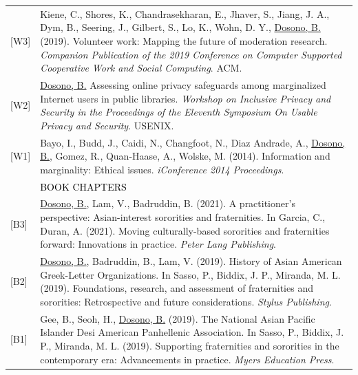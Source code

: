 \documentclass[12pt]{article}
\begin{document}
{\begin{longtable}{R{0.75in}p{5.0in}}
\footnotesize{[W3]} & Kiene, C., Shores, K., Chandrasekharan, E., Jhaver, S., Jiang, J. A., Dym, B., Seering, J., Gilbert, S., Lo, K., Wohn, D. Y., \href{https://dl.acm.org/authorize?N690536}{Dosono, B.} (2019). Volunteer work: Mapping the future of moderation research. \textit{Companion Publication of the 2019 Conference on Computer Supported Cooperative Work and Social Computing}. ACM.\\

\footnotesize{[W2]} & \href{https://www.usenix.org/sites/default/files/soups15_full_proceedings.pdf}{Dosono, B.} Assessing online privacy safeguards among marginalized Internet users in public libraries. \textit{Workshop on Inclusive Privacy and Security in the Proceedings of the Eleventh Symposium On Usable Privacy and Security}. USENIX. \medskip \\

\footnotesize{[W1]} & Bayo, I., Budd, J., Caidi, N., Changfoot, N., Diaz Andrade, A., \href{https://doi.org/10.9776/14223}{Dosono, B.}, Gomez, R., Quan-Haase, A., Wolske, M. (2014). Information and marginality: Ethical issues. \textit{iConference 2014 Proceedings}. \medskip \\ \pagebreak

& \large \textcolor{black}{\uppercase{Book Chapters}}\\

\footnotesize{[B3]} & \href{https://www.peterlang.com/document/1062327}{Dosono, B.}, Lam, V., Badruddin, B. (2021). A practitioner's perspective: Asian-interest sororities and fraternities. In Garcia, C., Duran, A. (2021). Moving culturally-based sororities and fraternities forward: Innovations in practice. \textit{Peter Lang Publishing}.\\

\footnotesize{[B2]} & \href{https://myersedpress.presswarehouse.com/browse/book/9781975502645/Foundations-Research-and-Assessment-of-Fraternities-and-Sororities}{Dosono, B.}, Badruddin, B., Lam, V. (2019). History of Asian American Greek-Letter Organizations. In Sasso, P., Biddix, J. P., Miranda, M. L. (2019). Foundations, research, and assessment of fraternities and sororities: Retrospective and future considerations. \textit{Stylus Publishing}.\\

\footnotesize{[B1]} & Gee, B., Seoh, H., \href{https://myersedpress.presswarehouse.com/browse/book/9781975502683/Supporting-Fraternities-and-Sororities-in-the-Contemporary-Era}{Dosono, B.} (2019). The National Asian Pacific Islander Desi American Panhellenic Association. In Sasso, P., Biddix, J. P., Miranda, M. L. (2019). Supporting fraternities and sororities in the contemporary era: Advancements in practice. \textit{Myers Education Press}.\medskip \\ 


\end{longtable}}
\end{document}
